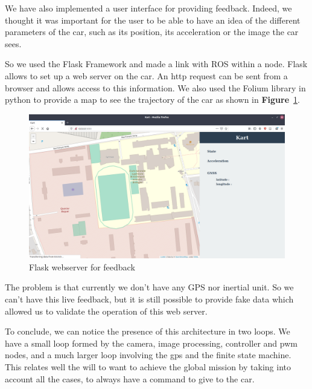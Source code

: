 We have also implemented a user interface for providing feedback. Indeed, we
thought it was important for the user to be able to have an idea of the
different parameters of the car, such as its position, its acceleration or
the image the car sees.

So we used the Flask Framework and made a link with ROS within a node.
Flask allows to set up a web server on the car. An http request can be
sent from a browser and allows access to this information. We also used
the Folium library in python to provide a map to see the trajectory of
the car as shown in \textbf{Figure}~\ref{fig:flask}.

\begin{figure}[!ht]
    \begin{center}
        \includegraphics[width=\textwidth]{Images/Flask_server.png}
    \end{center}
    \caption{Flask webserver for feedback}
    \label{fig:flask}
\end{figure}

The problem is that currently we don't have any GPS nor inertial unit.
So we can't have this live feedback, but it is still possible to provide
fake data which allowed us to validate the operation of this web server.

To conclude, we can notice the presence of this architecture in two loops. We have a small loop formed
by the camera, image processing, controller and pwm nodes, and a much larger loop involving
the gps and the finite state machine. This relates well the will to want to achieve the
global mission by taking into account all the cases, to always have a command to give to
the car.

\newpage